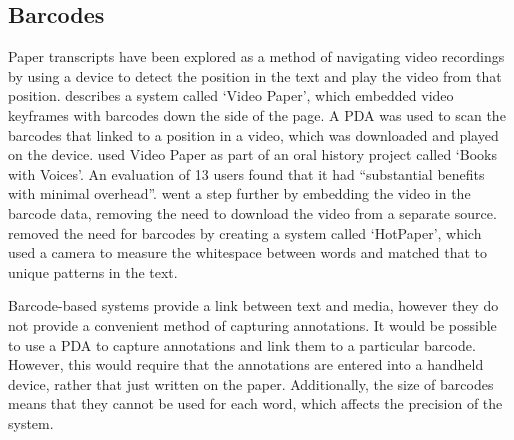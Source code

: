 
\subsection{Barcodes}
Paper transcripts have been explored as a method of navigating video recordings by using a device to detect the
position in the text and play the video from that position. \citet{Hull2003} describes a system called `Video Paper',
which embedded video keyframes with barcodes down the side of the page. A PDA was used to scan the barcodes that linked
to a position in a video, which was downloaded and played on the device. \citet{Klemmer2003} used Video Paper as part
of an oral history project called `Books with Voices'. An evaluation of 13 users found that it had ``substantial
benefits with minimal overhead''.  \citet{Erol2007} went a step further by embedding the video in the barcode data,
removing the need to download the video from a separate source. \citet{Erol2008} removed the need for barcodes by
creating a system called `HotPaper', which used a camera to measure the whitespace between words and matched that to
unique patterns in the text.

Barcode-based systems provide a link between text and media, however they do not provide a convenient method of
capturing annotations. It would be possible to use a PDA to capture annotations and link them to a particular barcode.
However, this would require that the annotations are entered into a handheld device, rather that just written on the
paper.  Additionally, the size of barcodes means that they cannot be used for each word, which affects the precision of
the system.

